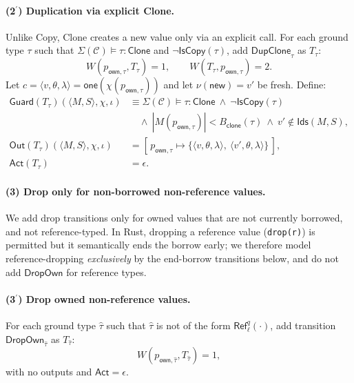 \documentclass[runningheads]{llncs}
\begin{document}
\paragraph{(2$^{\prime}$) Duplication via explicit Clone.}
Unlike Copy, Clone creates a new value only via an explicit call. For each ground type $\tau$ such that
$\Sigma(\mathcal{C})\models \tau:\mathsf{Clone}$ and $\neg \mathsf{IsCopy}(\tau)$,
add $\mathsf{DupClone}_\tau$ as $T_{\tau}$:
\begin{equation*}
    W(p_{\mathsf{own},\tau},T_\tau)=1,\qquad
    W(T_\tau,p_{\mathsf{own},\tau})=2.
\end{equation*}
Let $c=\langle v,\theta,\lambda\rangle=\mathsf{one}(\chi(p_{\mathsf{own},\tau}))$
and let $\nu(\mathsf{new})=v'$ be fresh. Define:
\begin{align*}
\mathsf{Guard}(T_\tau)(\langle M,S\rangle,\chi,\iota)
&\equiv \Sigma(\mathcal{C})\models \tau:\mathsf{Clone}
\ \wedge\ \neg \mathsf{IsCopy}(\tau)\\
&\quad \wedge\ |M(p_{\mathsf{own},\tau})| < B_{\mathsf{clone}}(\tau)\ \wedge\ v'\notin \mathsf{Ids}(M,S),\\
\mathsf{Out}(T_\tau)(\langle M,S\rangle,\chi,\iota)
&= [\,p_{\mathsf{own},\tau}\mapsto \{\langle v,\theta,\lambda\rangle,\ \langle v',\theta,\lambda\rangle\}\,],\\
\mathsf{Act}(T_\tau)
&= \epsilon.
\end{align*}

\paragraph{(3) Drop only for non-borrowed non-reference values.}
We add drop transitions only for owned values that are not currently borrowed, and not reference-typed.
In Rust, dropping a reference value (\texttt{drop(r)}) is permitted but it semantically ends the borrow early;
we therefore model reference-dropping \emph{exclusively} by the end-borrow transitions below, and do not add
$\mathsf{DropOwn}$ for reference types.

\paragraph{(3$^{\prime}$) Drop owned non-reference values.}
For each ground type $\hat\tau$ such that $\hat\tau$ is not of the form $\mathsf{Ref}^{q}_{\ell}(\cdot)$,
add transition $\mathsf{DropOwn}_{\hat\tau}$ as $T_{\hat\tau}$:
\begin{equation*}
    W(p_{\mathsf{own},\hat\tau},T_{\hat\tau})=1,
\end{equation*}
with no outputs and $\mathsf{Act}=\epsilon$.
\end{document}
